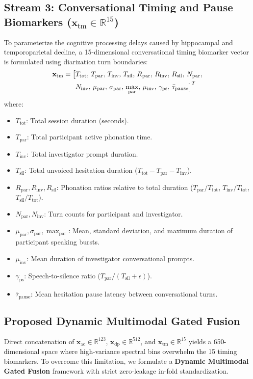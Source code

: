 \documentclass[conference]{IEEEtran}
\begin{document}
\subsection{Stream 3: Conversational Timing and Pause Biomarkers ($\mathbf{x}_{\text{tm}} \in \mathbb{R}^{15}$)}
To parameterize the cognitive processing delays caused by hippocampal and temporoparietal decline, a 15-dimensional conversational timing biomarker vector is formulated using diarization turn boundaries:
\begin{align}
\mathbf{x}_{\text{tm}} = \big[ & T_{\text{tot}},\, T_{\text{par}},\, T_{\text{inv}},\, T_{\text{sil}},\, R_{\text{par}},\, R_{\text{inv}},\, R_{\text{sil}},\, N_{\text{par}}, \notag \\
& N_{\text{inv}},\, \mu_{\text{par}},\, \sigma_{\text{par}},\, \max_{\text{par}},\, \mu_{\text{inv}},\, \gamma_{\text{ps}},\, \bar{\tau}_{\text{pause}} \big]^T
\label{eq:timing_vec}
\end{align}
where:
\begin{itemize}
    \item $T_{\text{tot}}$: Total session duration (seconds).
    \item $T_{\text{par}}$: Total participant active phonation time.
    \item $T_{\text{inv}}$: Total investigator prompt duration.
    \item $T_{\text{sil}}$: Total unvoiced hesitation duration ($T_{\text{tot}} - T_{\text{par}} - T_{\text{inv}}$).
    \item $R_{\text{par}}, R_{\text{inv}}, R_{\text{sil}}$: Phonation ratios relative to total duration ($T_{\text{par}}/T_{\text{tot}}$, $T_{\text{inv}}/T_{\text{tot}}$, $T_{\text{sil}}/T_{\text{tot}}$).
    \item $N_{\text{par}}, N_{\text{inv}}$: Turn counts for participant and investigator.
    \item $\mu_{\text{par}}, \sigma_{\text{par}}, \max_{\text{par}}$: Mean, standard deviation, and maximum duration of participant speaking bursts.
    \item $\mu_{\text{inv}}$: Mean duration of investigator conversational prompts.
    \item $\gamma_{\text{ps}}$: Speech-to-silence ratio ($T_{\text{par}} / (T_{\text{sil}} + \epsilon)$).
    \item $\bar{\tau}_{\text{pause}}$: Mean hesitation pause latency between conversational turns.
\end{itemize}

\subsection{Proposed Dynamic Multimodal Gated Fusion}
Direct concatenation of $\mathbf{x}_{\text{ac}} \in \mathbb{R}^{123}$, $\mathbf{x}_{\text{dp}} \in \mathbb{R}^{512}$, and $\mathbf{x}_{\text{tm}} \in \mathbb{R}^{15}$ yields a 650-dimensional space where high-variance spectral bins overwhelm the 15 timing biomarkers. To overcome this limitation, we formulate a \textbf{Dynamic Multimodal Gated Fusion} framework with strict zero-leakage in-fold standardization.
\end{document}
